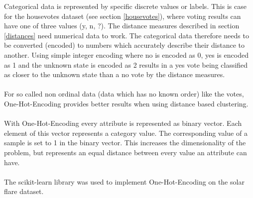 Categorical data is represented by specific discrete values or labels. This is case for the housevotes dataset (see section \ref{housevotes}), where 
voting results can have one of three values (y, n, ?).
The distance measures described in section \ref{distances} need numerical data to work. The categorical data therefore needs to be converted (encoded) to numbers which accurately describe their distance to another.
Using simple integer encoding where no is encoded as 0, yes is encoded as 1 and the unknown state is encoded as 2 results in a yes vote being classified as closer to the unknown state than a no vote by the distance measures.\\
\ \\
For so called non ordinal data (data which has no known order) like the votes, One-Hot-Encoding provides better results when using distance based clustering.\\
\ \\
With One-Hot-Encoding every attribute is represented as binary vector. Each element of this vector represents a category value. The corresponding value of a sample is set to 1 in the binary vector. 
This increases the dimensionality of the problem, but represents an equal distance between every value an attribute can have.\\
\ \\
The scikit-learn library \cite{scikitlearn} was used to implement One-Hot-Encoding on the solar flare dataset.
